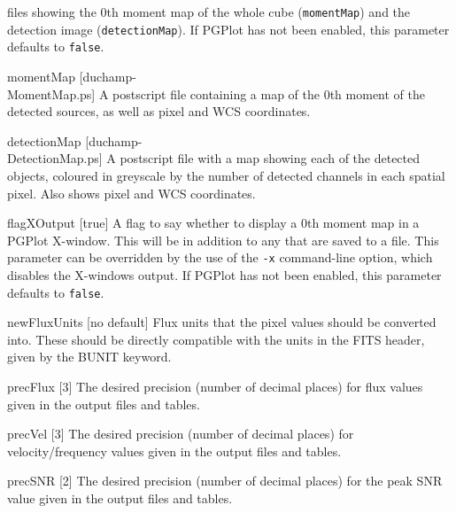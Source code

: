 \begin{Lentry}
  files showing the 0th moment map of the whole cube
  (\texttt{momentMap}) and the detection image
  (\texttt{detectionMap}). If PGPlot has not been enabled, this
  parameter defaults to \texttt{false}.
\item[{momentMap [duchamp-\\MomentMap.ps]}] A postscript file
  containing a map of the 0th moment of the detected sources, as well
  as pixel and WCS coordinates.
\item[{detectionMap [duchamp-\\DetectionMap.ps]}] A postscript
  file with a map showing each of the detected objects, coloured in
  greyscale by the number of detected channels in each spatial
  pixel. Also shows pixel and WCS coordinates.
\item[{flagXOutput [true]}] A flag to say whether to display a
  0th moment map in a PGPlot X-window. This will be in addition to any
  that are saved to a file. This parameter can be overridden by the
  use of the \texttt{-x} command-line option, which disables the
  X-windows output. If PGPlot has not been enabled, this parameter
  defaults to \texttt{false}.
\item[{newFluxUnits [no default]}] Flux units that the pixel values
  should be converted into. These should be directly compatible with
  the units in the FITS header, given by the BUNIT keyword.
\item[{precFlux [3]}] The desired precision (\ie number of decimal
  places) for flux values given in the output files and tables.
\item[{precVel [3]}] The desired precision (\ie number of decimal
  places) for velocity/frequency values given in the output files and
  tables.
\item[{precSNR [2]}] The desired precision (\ie number of decimal
  places) for the peak SNR value given in the output files and tables.
\end{Lentry}

